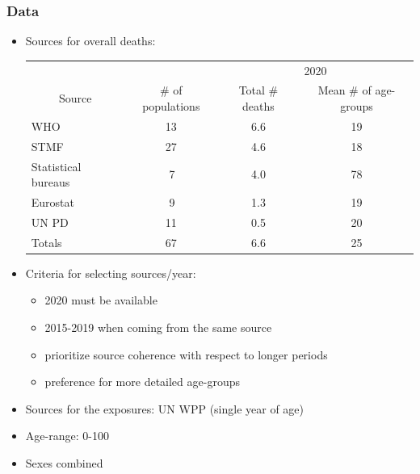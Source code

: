 \documentclass[table,xcdraw,dvipsnames,handout]{beamer}
\begin{document}
\begin{frame}[fragile]\frametitle{Data}
	\vspace{-0.2cm}
\begin{itemize}
	\item Sources for overall deaths:
	\begin{scriptsize}
	\begin{table}[]
		\begin{tabular}{l|c|c|c}
			\multicolumn{1}{c|}{}                         &                                     & \multicolumn{2}{c}{2020}                                \\
			\multicolumn{1}{c|}{\multirow{-2}{*}{Source}} & \multirow{-2}{*}{\# of populations} & Total \# deaths             & Mean \# of age-groups      \\ \cline{3-4} 
			\rowcolor[HTML]{EFEFEF} 
			WHO                     & 13                                  & 6.6 & 19                         \\
			\rowcolor[HTML]{FFFFFF} 
			STMF                                          & 27                                  & 4.6                         & 18                         \\
			\rowcolor[HTML]{EFEFEF} 
			Statistical bureaus                           & \;\,7 & 4.0 &78 \\
			\rowcolor[HTML]{FFFFFF} 
			Eurostat                                      & \;\,9 & 1.3                         & 19                         \\
			\rowcolor[HTML]{EFEFEF} 
			UN PD                        & 11                                  & 0.5 & 20 \\ \hline
			\rowcolor[HTML]{FFFFFF} 
			Totals                                        & 67                                  & 6.6                         & 25                        
		\end{tabular}
	\end{table}
	
\end{scriptsize}
	\item Criteria for selecting sources/year:
	\begin{itemize}
		\item 2020 must be available
		\item 2015-2019 when coming from the same source
		\item prioritize source coherence with respect to longer periods
		\item preference for more detailed age-groups
	\end{itemize}
	\item Sources for the exposures: UN WPP (single year of age)
\item Age-range: 0-100
\item Sexes combined
\end{itemize}

	
\end{frame}
\end{document}
